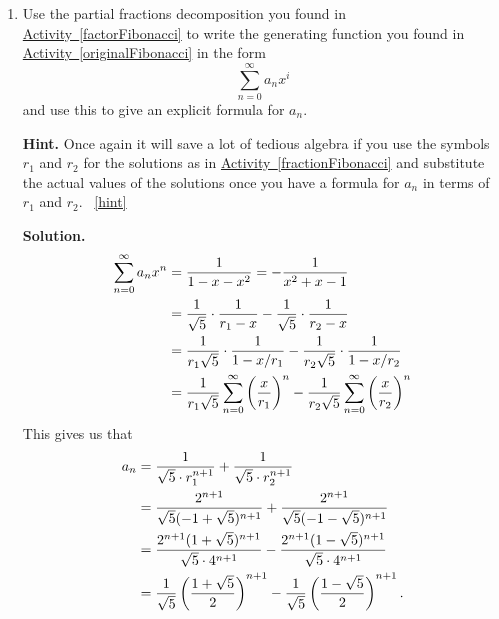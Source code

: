 \documentclass{book}
\begin{document}
\setcounter{project}{269}
\addtocounter{project}{-1}
\begin{activity}[]\label{solveFibonacci}
\leavevmode%
\begin{enumerate}[font=\bfseries,label=(\alph*),ref=\alph*]
\item\label{task-249} \hypertarget{p-1386}{}%
Use the partial fractions decomposition you found in \hyperref[factorFibonacci]{Activity~\ref{factorFibonacci}} to write the generating function you found in \hyperref[originalFibonacci]{Activity~\ref{originalFibonacci}} in the form%
\begin{equation*}
\sum_{n=0}^\infty a_nx^i
\end{equation*}
and use this to give an explicit formula for \(a_n\).%
\par\smallskip%
\noindent\textbf{Hint.}\hypertarget{hint-172}{}\quad%
\hypertarget{p-1387}{}%
Once again it will save a lot of tedious algebra if you use the symbols \(r_1\) and \(r_2\) for the solutions as in \hyperref[fractionFibonacci]{Activity~\ref{fractionFibonacci}} and substitute the actual values of the solutions once you have a formula for \(a_n\) in terms of \(r_1\) and \(r_2\).%
~\hfill{\tiny\hyperlink{a-269.a}{[hint]}\hypertarget{q-269.a}{}}\par\smallskip%
\noindent\textbf{Solution.}\hypertarget{solution-171}{}\quad%
\hypertarget{p-1388}{}%
%
\begin{align*}
\sum_{n=0}^\infty a_nx^n  &= \frac{1}{1-x-x^2}= -\frac{1}{x^2+x-1}\\
&= \frac{1}{\sqrt{5}}\cdot\frac{1}{r_1-x} -\frac{1}{\sqrt{5}}\cdot\frac{1}{r_2-x}\\
&= \frac{1}{r_1\sqrt{5}}\cdot\frac{1}{1-x/r_1} -\frac{1}{r_2\sqrt{5}}\cdot\frac{1}{1-x/r_2}\\
&= \frac{1}{r_1\sqrt{5}}\sum_{n=0}^\infty\left(\frac{x}{r_1}\right)^n
-\frac{1}{r_2\sqrt{5}}\sum_{n=0}^\infty  \left(\frac{x}{r_2}\right)^n
\end{align*}
This gives us that%
\begin{align*}
a_n \amp= \frac{1}{\sqrt{5}\cdot r_1^{n+1}}
+\frac{1}{\sqrt{5}\cdot r_2^{n+1}}\\
\amp= \frac{2^{n+1}}{\sqrt{5}(-1+\sqrt{5})^{n+1}}
+
\frac{2^{n+1}}{\sqrt{5}(-1-\sqrt{5})^{n+1}}\\
\amp= \frac{2^{n+1}(1+\sqrt{5})^{n+1}}{\sqrt{5}\cdot
4^{n+1}}-
\frac{2^{n+1}(1-\sqrt{5})^{n+1}}{\sqrt{5}\cdot4^{n+1}}\\
\amp= \frac{1}{\sqrt{5}}\left(\frac{1+\sqrt{5}}{2}\right)^{n+1}-
\frac{1}{\sqrt{5}}\left(\frac{1-\sqrt{5}}{2}\right)^{n+1}.

\end{align*}
\end{enumerate}
\end{activity}
\end{document}
